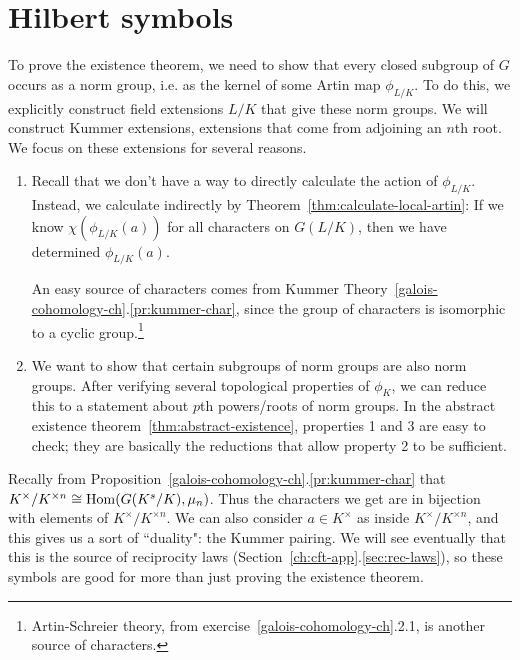 \section{Hilbert symbols}
To prove the existence theorem, we need to show that every closed subgroup of $G$ occurs as a norm group, i.e. as the kernel of some Artin map $\phi_{L/K}$. To do this, we explicitly construct field extensions $L/K$ that give these norm groups. We will construct Kummer extensions, extensions that come from adjoining an $n$th root. We focus on these extensions for several reasons.
\begin{enumerate}
\item Recall that we don't have a way to directly calculate the action of $\phi_{L/K}$. Instead, we calculate indirectly by Theorem~\ref{thm:calculate-local-artin}: If we know $\chi(\phi_{L/K}(a))$ for all characters on $G(L/K)$, then we have determined $\phi_{L/K}(a)$.

An easy source of characters comes from Kummer Theory~\ref{galois-cohomology-ch}.\ref{pr:kummer-char}, since the group of characters is isomorphic to a cyclic group.\footnote{Artin-Schreier theory, from exercise~\ref{galois-cohomology-ch}.2.1, is another source of characters.}
\item We want to show that certain subgroups of norm groups are also norm groups. After verifying several topological properties of $\phi_{K}$, we can reduce this to a statement about $p$th powers/roots of norm groups. In the abstract existence theorem~\ref{thm:abstract-existence}, properties 1 and 3 are easy to check; they are basically the reductions that allow property 2 to be sufficient.
\end{enumerate}
Recally from Proposition~\ref{galois-cohomology-ch}.\ref{pr:kummer-char} that $K^{\times}/K^{\times n}\cong \operatorname{Hom}(G(K^s/K),\mu_n)$. Thus the characters we get are in bijection with elements of $K^{\times}/K^{\times n}$. We can also consider $a\in K^{\times}$ as inside $K^{\times}/K^{\times n}$, and this gives us a sort of ``duality": the Kummer pairing. We will see eventually that this is the source of reciprocity laws (Section~\ref{ch:cft-app}.\ref{sec:rec-laws}), so these symbols are good for more than just proving the existence theorem.

